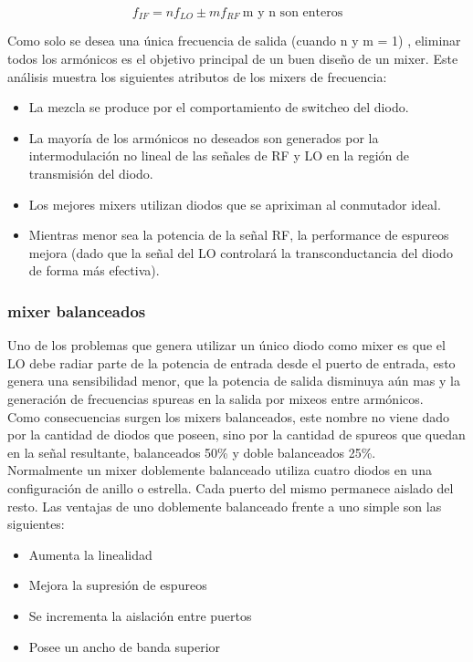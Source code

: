 \documentclass[a4paper,10pt]{article}
\begin{document}
	\begin{equation}\label{eq:003}
 		f_{IF} = n f_{LO}\pm m f_{RF}~\text{m y n son enteros}
	\end{equation}

	\indent Como solo se desea una única frecuencia de salida (cuando n y m = 1)
	, eliminar todos los armónicos es el objetivo principal de un buen diseño 
	de un mixer. Este análisis muestra los siguientes atributos de los mixers de
	frecuencia:

	\begin{itemize}
		\item La mezcla se produce por el comportamiento de switcheo del diodo.
		\item La mayoría de los armónicos no deseados son generados por la 
		intermodulación no lineal de las señales de RF y LO en la región de 
		transmisión del diodo.
		\item Los mejores mixers utilizan diodos que se apriximan al conmutador 
		ideal.
		\item Mientras menor sea la potencia de la señal RF, la performance de 
		espureos mejora (dado que la señal del LO controlará la 
		transconductancia del diodo de forma más efectiva).
	\end{itemize}

	\subsubsection{mixer balanceados}
	\indent Uno de los problemas que genera utilizar un único diodo como mixer 
	es que el LO debe radiar parte de la potencia de entrada desde el puerto de 
	entrada, esto genera una sensibilidad menor, que la potencia de salida 
	disminuya aún mas y la generación de frecuencias spureas en la salida por 
	mixeos entre armónicos. \\
	\indent Como consecuencias surgen los mixers balanceados, este nombre no 
	viene dado por la cantidad de diodos que poseen, sino por la cantidad de 
	spureos que quedan en la señal resultante, balanceados 50\% y doble 
	balanceados 25\%. \\
	\indent Normalmente un mixer doblemente balanceado utiliza cuatro diodos en 
	una configuración de anillo o estrella. Cada puerto del mismo permanece
	aislado del resto. Las ventajas de uno doblemente balanceado frente a uno 
	simple son las siguientes:
	
	\begin{itemize}
		\item Aumenta la linealidad
		\item Mejora la supresión de espureos
		\item Se incrementa la aislación entre puertos
		\item Posee un ancho de banda superior
	\end{itemize}
\end{document}
